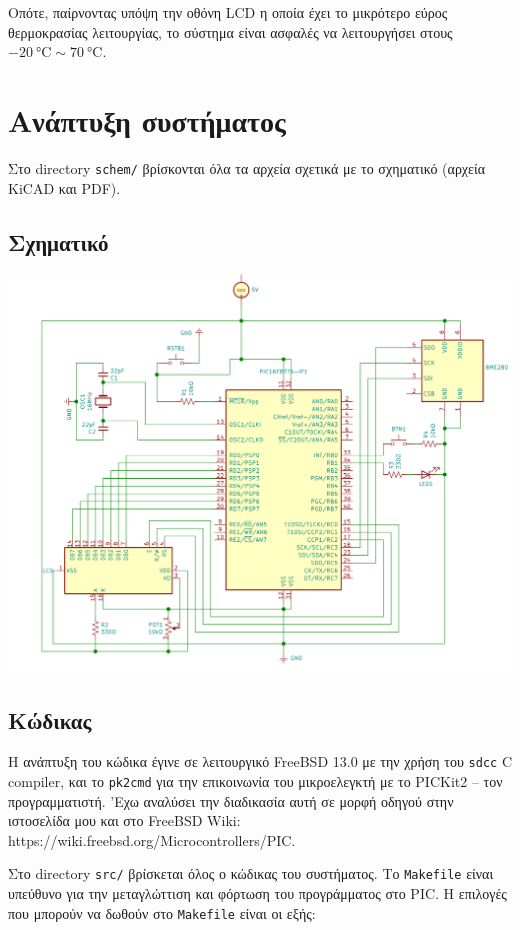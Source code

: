 \documentclass{article}
\begin{document}
Οπότε, παίρνοντας υπόψη την οθόνη LCD η οποία έχει το μικρότερο
εύρος θερμοκρασίας λειτουργίας, το σύστημα είναι ασφαλές να
λειτουργήσει στους $\SI{-20}{\celsius} \sim \SI{70}{\celsius}$.

\section{Ανάπτυξη συστήματος}

Στο directory \lstinline{schem/} βρίσκονται όλα τα αρχεία
σχετικά με το σχηματικό (αρχεία KiCAD και PDF).

\subsection{Σχηματικό}
\begin{center}
	\includegraphics[width=\linewidth]{./res/schem.png}
\end{center}

\subsection{Κώδικας}
Η ανάπτυξη του κώδικα έγινε σε λειτουργικό FreeBSD 13.0 με την χρήση του
\lstinline{sdcc} C compiler, και το \lstinline{pk2cmd} για την
επικοινωνία του μικροελεγκτή με το PICKit2 -- τον προγραμματιστή.
'Εχω αναλύσει την διαδικασία αυτή σε μορφή οδηγού στην ιστοσελίδα
μου και στο FreeBSD Wiki: https://wiki.freebsd.org/Microcontrollers/PIC.

Στο directory \lstinline{src/} βρίσκεται όλος ο κώδικας του συστήματος.
Το \lstinline{Makefile} είναι υπεύθυνο για την μεταγλώττιση και φόρτωση
του προγράμματος στο PIC. Η επιλογές που μπορούν να δωθούν στο \lstinline{Makefile}
είναι οι εξής:
\end{document}
